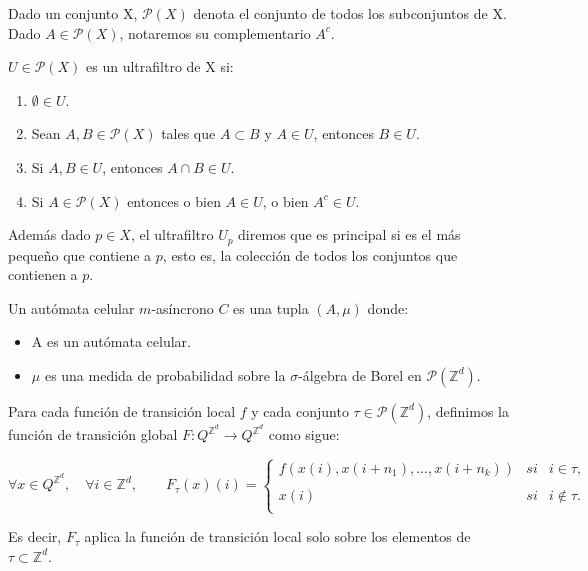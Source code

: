 \documentclass[../proyecto.tex]{memoir}
\begin{document}
Dado un conjunto X, $\mathcal{P}(X)$ denota el conjunto de todos los subconjuntos de X. Dado $A \in \mathcal{P}(X)$, notaremos su complementario $A^{c}$. 
\begin{defi}
$U \in \mathcal{P}(X)$ es un ultrafiltro de X si:

\begin{enumerate}
\item $\emptyset \in U$.
\item Sean $A,B \in \mathcal{P}(X)$ tales que $A \subset B$ y $ A \in U$, entonces $B \in U$.
\item Si $A,B \in U$, entonces $A \cap B \in U$.
\item Si $A \in \mathcal{P}(X)$ entonces o bien $A \in U$, o bien $ A^{c} \in U$.
\end{enumerate}

Además dado $p \in X$, el ultrafiltro $U_{p}$ diremos que es principal si es el más pequeño que contiene a $p$, esto es, la colección de todos los conjuntos que contienen a $p$.
\end{defi}

\begin{defi}
Un autómata celular $m$-asíncrono $C$ es una tupla $(A, \mu)$ donde: 
\begin{itemize}
\item A es un autómata celular.
\item $\mu$ es una medida de probabilidad sobre la $\sigma$-álgebra de Borel en $\mathcal{P}(\mathds{Z}^{d})$.
\end{itemize} 
\end{defi}

\begin{defi}

Para cada función de transición local $f$ y cada conjunto $\tau \in \mathcal{P}(\mathds{Z}^{d})$, definimos la función de transición global $F:Q^{\mathds{Z}^{d}} \to Q^{\mathds{Z}^{d}}$ como sigue:

\begin{equation*}
	\forall x \in Q^{\mathds{Z}^{d}}, \quad \forall i \in \mathds{Z}^{d}, \qquad
	F_{\tau}(x)(i) = \left\{ \begin{array}{lcc}
             f(x(i),x(i+n_{1}),...,x(i+n_{k})) &   si  & i \in \tau ,\\
             \\ x(i) & si  & i \notin \tau .\\
             \end{array}
             \right.
\end{equation*}

Es decir, $F_{\tau}$ aplica la función de transición local solo sobre los elementos de $\tau \subset \mathds{Z}^{d}$. 
\end{defi}
\end{document}

